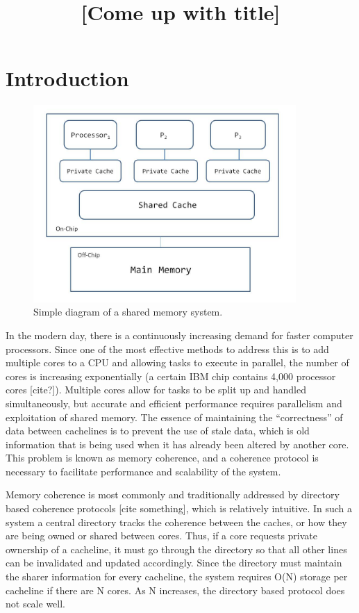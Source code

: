 \documentclass[12pt]{article}
\title{[Come up with title]}
\date{}
\begin{document}
	\maketitle


\section{Introduction}

\begin{figure}
\begin{center}
  \includegraphics[width=10cm]{distributed_system.JPG}
  \caption{Simple diagram of a shared memory system.}
  \label{fig:distributed}
\end{center}
\end{figure}

In the modern day, there is a continuously increasing demand for faster computer processors. Since one of the most effective methods to address this is to add multiple cores to a CPU and allowing tasks to execute in parallel, the number of cores is increasing exponentially (a certain IBM chip contains 4,000 processor cores [cite?]). Multiple cores allow for tasks to be split up and handled simultaneously, but accurate and efficient performance requires parallelism and exploitation of shared memory. The essence of maintaining the “correctness” of data between cachelines is to prevent the use of stale data, which is old information that is being used when it has already been altered by another core. This problem is known as memory coherence, and a coherence protocol is necessary to facilitate performance and scalability of the system.

Memory coherence is most commonly and traditionally addressed by directory based coherence protocols [cite something], which is relatively intuitive. In such a system a central directory tracks the coherence between the caches, or how they are being owned or shared between cores. Thus, if a core requests private ownership of a cacheline, it must go through the directory so that all other lines can be invalidated and updated accordingly. Since the directory must maintain the sharer information for every cacheline, the system requires O(N) storage per cacheline if there are N cores. As N increases, the directory based protocol does not scale well.
\end{document}
